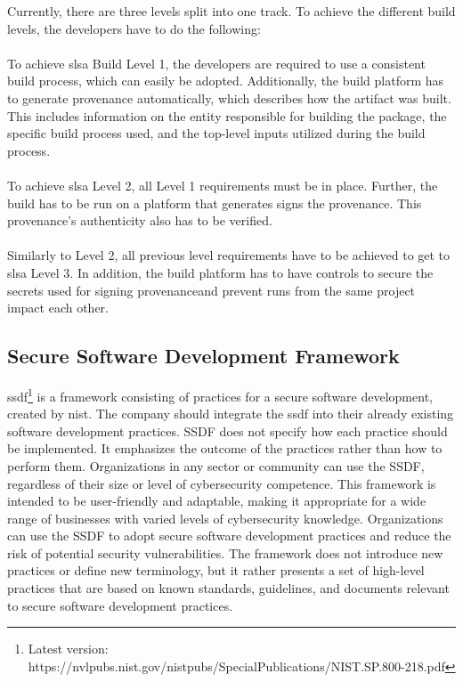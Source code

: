 Currently, there are three levels split into one track. To achieve the different build levels, the developers have to do the following:
\\~\\
To achieve \acrshort{slsa} Build Level 1, the developers are required to use a consistent build process, which can easily be adopted. Additionally, the build platform has to generate \gls{provenance} automatically, which describes how the artifact was built. This includes information on the entity responsible for building the package, the specific build process used, and the top-level inputs utilized during the build process.
\\~\\
To achieve \acrshort{slsa} Level 2, all Level 1 requirements must be in place. Further, the build has to be run on a platform that generates signs the \gls{provenance}. This \gls{provenance}'s authenticity also has to be verified.
\\~\\
Similarly to Level 2, all previous level requirements have to be achieved to get to \acrshort{slsa} Level 3. In addition, the build platform has to have controls to secure the secrets used for signing \gls{provenance}and prevent runs from the same project impact each other. 


\subsection{Secure Software Development Framework}
\acrlong{ssdf}\footnote{Latest version: https://nvlpubs.nist.gov/nistpubs/SpecialPublications/NIST.SP.800-218.pdf} is a framework consisting of practices for a secure software development, created by \acrlong{nist}. The company should integrate the \acrshort{ssdf} into their already existing software development practices. SSDF does not specify how each practice should be implemented. It emphasizes the outcome of the practices rather than how to perform them. Organizations in any sector or community can use the SSDF, regardless of their size or level of cybersecurity competence. This framework is intended to be user-friendly and adaptable, making it appropriate for a wide range of businesses with varied levels of cybersecurity knowledge. Organizations can use the SSDF to adopt secure software development practices and reduce the risk of potential security vulnerabilities. The framework does not introduce new practices or define new terminology, but it rather presents a set of high-level practices that are based on known standards, guidelines, and documents relevant to secure software development practices. 

